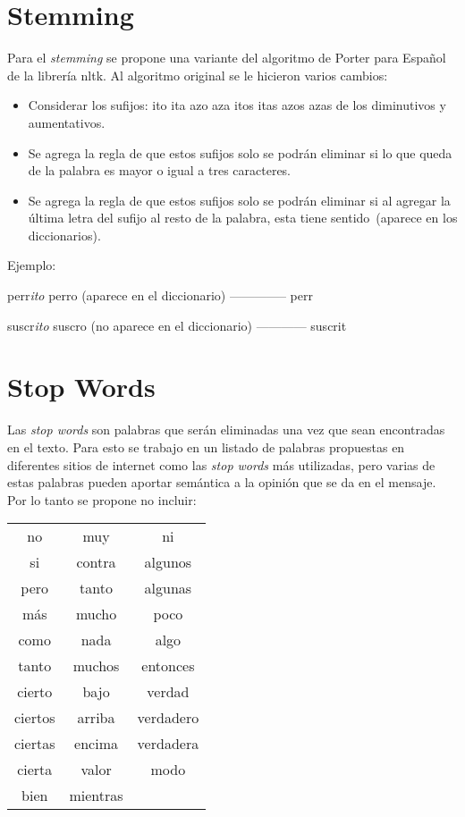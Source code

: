 \section{Stemming}
Para el \emph{stemming} se propone una variante del algoritmo de Porter para Español de la 
librería nltk. Al algoritmo original se le hicieron varios cambios:
\begin{itemize}
 \item Considerar los sufijos: ito ita azo aza itos itas azos azas
 de los diminutivos y aumentativos.
 \item Se agrega la regla de que estos sufijos solo se podrán eliminar si lo que queda de la palabra es
 mayor o igual a tres caracteres.
 \item Se agrega la regla de que estos sufijos solo se podrán eliminar si al agregar la 
 última letra del sufijo al resto de la palabra, esta tiene sentido~(aparece en los diccionarios).
\end{itemize}

Ejemplo:

perr\emph{ito} 
perro (aparece en el diccionario)
--------------
perr

suscr\emph{ito}
suscro (no aparece en el diccionario)
------------
suscrit

\section{Stop Words}

Las \emph{stop words} son palabras que serán eliminadas una vez que sean encontradas en el texto.
Para esto se trabajo en un listado de palabras propuestas en diferentes sitios de internet 
como las \emph{stop words} más utilizadas, pero varias de estas palabras pueden aportar 
semántica a la opinión que se da en el mensaje. Por lo tanto se propone no incluir:

\begin{center}
\begin{tabular}{c c c}
  no & muy & ni \\
  si & contra & algunos \\
  pero & tanto & algunas \\
  más & mucho & poco \\ 
  como & nada & algo \\ 
  tanto & muchos & entonces \\
  cierto & bajo & verdad \\
  ciertos & arriba & verdadero \\
  ciertas & encima & verdadera \\
  cierta & valor & modo \\
  bien & mientras & \\
\end{tabular} 
\end{center}

